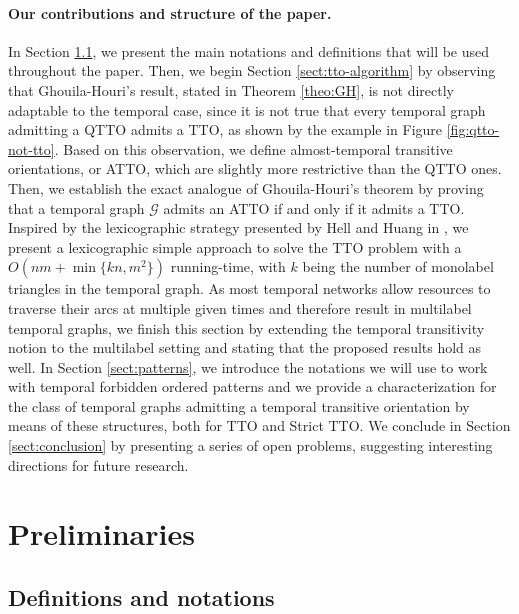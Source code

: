 \documentclass[runningheads]{llncs}
\begin{document}
\paragraph*{Our contributions and structure of the paper.} In Section \ref{sect:preliminaries}, we present the main notations and definitions that will be used throughout the paper. Then, we begin Section \ref{sect:tto-algorithm} by observing that Ghouila-Houri's result, stated in Theorem \ref{theo:GH}, is not directly adaptable to the temporal case, since it is not true that every temporal graph admitting a QTTO admits a TTO, as shown by the example in Figure \ref{fig:qtto-not-tto}. Based on this observation, we define almost-temporal transitive orientations, or ATTO, which are slightly more restrictive than the QTTO ones. %
Then, we establish the exact analogue of Ghouila-Houri's theorem by proving that a temporal graph $\mathcal{G}$ admits an ATTO if and only if it admits a TTO. Inspired by the lexicographic strategy presented by Hell and Huang in \cite{hell1995lexicographic}, we present a lexicographic simple approach to solve the TTO problem with a $O(nm + \min\{kn,m^2\})$ running-time, with $k$ being the number of monolabel triangles in the temporal graph. As most temporal networks allow resources to traverse their arcs at multiple given times and therefore result in multilabel temporal graphs, we finish this section by extending the temporal transitivity notion to the multilabel setting and stating that the proposed results hold as well. In Section \ref{sect:patterns}, we introduce the notations we will use to work with temporal forbidden ordered patterns and we provide a characterization for the class of temporal graphs admitting a temporal transitive orientation by means of these structures, both for TTO and Strict TTO. We conclude in Section \ref{sect:conclusion} by presenting a series of open problems, suggesting interesting directions for future research.

\section{Preliminaries}

\subsection{Definitions and notations}
\label{sect:preliminaries}
\end{document}
